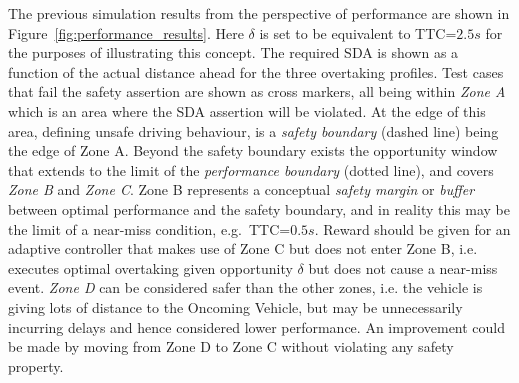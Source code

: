 The previous simulation results from the perspective of performance are shown in Figure~\ref{fig:performance_results}. Here $\delta$ is set to be equivalent to TTC=$2.5s$ \cite{Robbins2018,Chen2015,wang2019analysis} for the purposes of illustrating this concept. The required SDA is shown as a function of the actual distance ahead for the three overtaking profiles. Test cases that fail the safety assertion are shown as cross markers, all being within \emph{Zone A} which is an area where the SDA assertion will be violated. At the edge of this area, defining unsafe driving behaviour, is a \emph{safety boundary} (dashed line) being the edge of Zone A. Beyond the safety boundary exists the opportunity window that extends to the limit of the \emph{performance boundary} (dotted line), and covers \emph{Zone B} and \emph{Zone C}. Zone B represents a conceptual \emph{safety margin} or \emph{buffer} between optimal performance and the safety boundary, and in reality this may be the limit of a near-miss condition, e.g.\ TTC=$0.5s$. Reward should be given for an adaptive controller that makes use of Zone C but does not enter Zone B, i.e. executes optimal overtaking given opportunity $\delta$ but does not cause a near-miss event. \emph{Zone D} can be considered safer than the other zones, i.e. the vehicle is giving lots of distance to the Oncoming Vehicle, but may be unnecessarily incurring delays and hence considered lower performance. An improvement could be made by moving from Zone D to Zone C without violating any safety property. 

